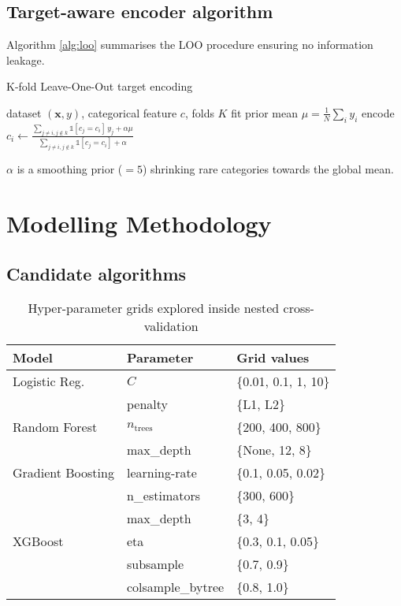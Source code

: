 \documentclass[12pt,a4paper]{article}
\begin{document}
\subsection{Target-aware encoder algorithm}
Algorithm \ref{alg:loo} summarises the LOO procedure ensuring no
information leakage.

\begin{algorithm}[H]
  \caption{K-fold Leave-One-Out target encoding}\label{alg:loo}
  \begin{algorithmic}[1]
    \Require dataset \((\mathbf{x},y)\), categorical feature \(c\),
             folds \(K\)
      \State fit prior mean \(\mu = \frac1{N}\sum_i y_i\)
        \State encode \(c_i \gets
          \frac{\sum_{j \neq i, j\notin k} \mathbb{1}[c_j=c_i]\,y_j
               + \alpha \mu}
               {\sum_{j \neq i, j\notin k} \mathbb{1}[c_j=c_i] + \alpha}\)
      \EndFor
    \EndFor
  \end{algorithmic}
\end{algorithm}

\(\alpha\) is a smoothing prior (\(=5\)) shrinking rare categories
towards the global mean.

\section{Modelling Methodology} \label{sec:models}

\subsection{Candidate algorithms}

\begin{table}[H]
  \centering
  \caption{Hyper-parameter grids explored inside
           nested cross-validation}\label{tab:grid}
  \begin{tabular}{@{}lll@{}}
    \toprule
    Model & Parameter & Grid values \\
    \midrule
    Logistic Reg. &
      \(C\)            & \{0.01, 0.1, 1, 10\} \\
    & penalty        & \{L1, L2\} \\
    Random Forest &
      \(n_{\text{trees}}\) & \{200, 400, 800\} \\
    & max\_depth     & \{None, 12, 8\} \\
    Gradient Boosting &
      learning-rate   & \{0.1, 0.05, 0.02\} \\
    & n\_estimators  & \{300, 600\} \\
    & max\_depth     & \{3, 4\} \\
    XGBoost &
      eta            & \{0.3, 0.1, 0.05\} \\
    & subsample      & \{0.7, 0.9\} \\
    & colsample\_bytree & \{0.8, 1.0\} \\
    \bottomrule
  \end{tabular}
\end{table}
\end{document}
